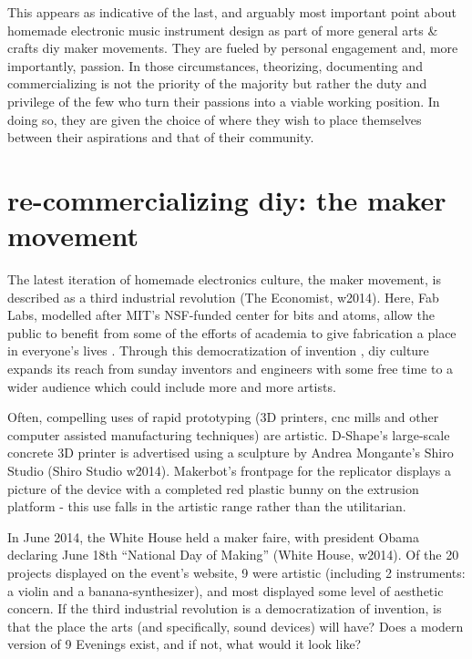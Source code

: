 This appears as indicative of the last, and arguably most important point about homemade electronic music instrument design as part of more general arts & crafts \/ diy \/ maker movements. They are fueled by personal engagement and, more importantly, passion. In those circumstances, theorizing, documenting and commercializing is not the priority of the majority but rather the duty and privilege of the few who turn their passions into a viable working position. In doing so, they are given the choice of where they wish to place themselves between their aspirations and that of their community. 

\section{re-commercializing diy: the maker movement}  

The latest iteration of homemade electronics culture, the maker movement, is described as a third industrial revolution (The Economist, w2014). Here, Fab Labs, modelled after MIT’s NSF-funded center for bits and atoms, allow the public to benefit from some of the efforts of academia to give fabrication a place in everyone’s lives \cite{padfield2014,blikstein2013}. Through this democratization of invention \cite{blikstein2013}, diy culture expands its reach from sunday inventors and engineers with some free time to a wider audience which could include more and more artists. 

	Often, compelling uses of rapid prototyping (3D printers, cnc mills and other computer assisted manufacturing techniques) are artistic. D-Shape’s large-scale concrete 3D printer is advertised using a sculpture by Andrea Mongante’s Shiro Studio (Shiro Studio w2014). Makerbot’s frontpage for the replicator displays a picture of the device with a completed red plastic bunny on the extrusion platform - this use falls in the artistic range rather than the utilitarian. 

In June 2014, the White House held a maker faire, with president Obama declaring June 18th “National Day of Making” (White House, w2014). Of the 20 projects displayed on the event’s website, 9 were artistic (including 2 instruments: a violin and a banana-synthesizer), and most displayed some level of aesthetic concern. If the third industrial revolution is a democratization of invention, is that the place the arts (and specifically, sound devices) will have? Does a modern version of 9 Evenings exist, and if not, what would it look like? 

